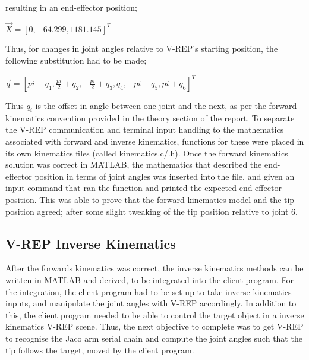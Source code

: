 \documentclass[12pt,openany,a4paper]{book}
\begin{document}
resulting in an end-effector position;

\vspace{\baselineskip}


$\vec{X} = [0, -64.299, 1181.145]^T$

\vspace{\baselineskip}


Thus, for changes in joint angles relative to V-REP's starting position, the following substitution had to be made;

\vspace{\baselineskip}


$\vec{q} = [ pi - q_1, \frac{pi}{2} + q_2, -\frac{pi}{2} + q_3, q_4, -pi + q_5, pi + q_6]^T$

\vspace{\baselineskip}

Thus $q_i$ is the offset in angle between one joint and the next, as per the forward kinematics convention provided in the theory section of the report. To separate the V-REP communication and terminal input handling to the mathematics associated with forward and inverse kinematics, functions for these were placed in its own kinematics files (called kinematics.c/.h). Once the forward kinematics solution was correct in MATLAB, the mathematics that described the end-effector position in terms of joint angles was inserted into the file, and given an input command that ran the function and printed the expected end-effector position. This was able to prove that the forward kinematics model and the tip position agreed; after some slight tweaking of the tip position relative to joint 6.


\subsection{V-REP Inverse Kinematics}
After the forwards kinematics was correct, the inverse kinematics methods can be written in MATLAB and derived, to be integrated into the client program. For the integration, the client program had to be set-up to take inverse kinematics inputs, and manipulate the joint angles with V-REP accordingly. In addition to this, the client program needed to be able to control the target object in a inverse kinematics V-REP scene. Thus, the next objective to complete was to get V-REP to recognise the Jaco arm serial chain and compute the joint angles such that the tip follows the target, moved by the client program.
\end{document}
